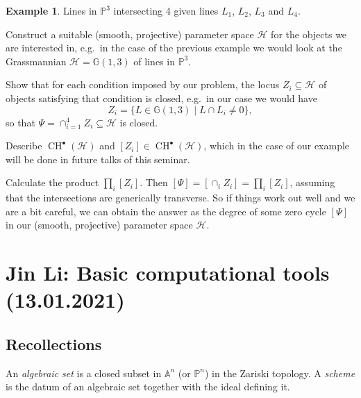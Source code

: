 \documentclass[12pt,a4paper]{amsart}
\theoremstyle{plain}
\theoremstyle{definition}
\newtheorem{exmp}[thm]{Example}
\theoremstyle{remark}
\begin{document}
\begin{exmp}
    Lines in $\mathbb{P}^{3}$ intersecting 4 given lines $L_{1}$, $L_{2}$, $L_{3}$ and $L_{4}$.
\end{exmp}

\textbullet\underline{} Construct a suitable (smooth, projective) parameter space $\mathcal{H}$ for the objects we are interested in, e.g.~in the case of the previous example we would look at the Grassmannian $\mathcal{H}=\mathbb{G}(1,3)$ of lines in $\mathbb{P}^{3}$.

\textbullet\underline{} Show that for each condition imposed by our problem, the locus $Z_{i}\subseteq \mathcal{H}$ of objects satisfying that condition is closed, e.g.~in our case we would have
\[ Z_{i}=\{ L\in \mathbb{G}(1,3)\mid L\cap L_{i}\neq 0 \}, \]
so that $\Psi=\cap_{i=1}^{4}Z_{i}\subseteq \mathcal{H}$ is closed.

\textbullet\underline{} Describe $\operatorname{CH}^{\bullet}(\mathcal{H})$ and $[Z_{i}]\in \operatorname{CH}^{\bullet}(\mathcal{H})$, which in the case of our example will be done in future talks of this seminar.

\textbullet\underline{} Calculate the product $\prod_{i}[Z_{i}]$.
Then $[\Psi]=[\cap_{i}Z_{i}]=\prod_{i}[Z_{i}]$, assuming that the intersections are generically transverse.
So if things work out well and we are a bit careful, we can obtain the answer as the degree \cite[Propostion 1.21]{eh16} of some zero cycle $[\Psi]$ in our (smooth, projective) parameter space $\mathcal{H}$.

\section{Jin Li: Basic computational tools (13.01.2021)}

\subsection{Recollections}

An \textit{algebraic set} is a closed subset in $\mathbb{A}^{n}$ (or $\mathbb{P}^{n}$) in the Zariski topology.
A \textit{scheme} is the datum of an algebraic set together with the ideal defining it.
\end{document}
